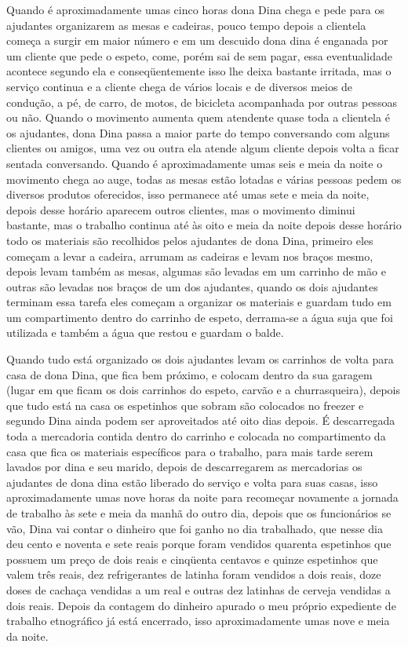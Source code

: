 Quando é aproximadamente umas cinco horas dona Dina chega e pede para os 
ajudantes organizarem as mesas e cadeiras, pouco tempo depois a clientela começa 
a surgir em maior número e em um descuido dona dina é enganada por um cliente 
que pede o espeto, come, porém sai de sem pagar, essa eventualidade acontece 
segundo ela e conseqüentemente isso lhe deixa bastante irritada, mas o serviço 
continua e a cliente chega de vários locais e de diversos meios de condução, a 
pé, de carro, de motos, de bicicleta acompanhada por outras pessoas ou não. 
Quando o movimento aumenta quem atendente quase toda a clientela é os ajudantes, 
dona Dina passa a maior parte do tempo conversando com alguns clientes ou 
amigos, uma vez ou outra ela atende algum cliente depois volta a ficar sentada 
conversando. Quando é aproximadamente umas seis e meia da noite o movimento 
chega ao auge, todas as mesas estão lotadas e várias pessoas pedem os diversos 
produtos oferecidos, isso permanece até umas sete e meia da noite, depois desse 
horário aparecem outros clientes, mas o movimento diminui bastante, mas o 
trabalho continua até às oito e meia da noite depois desse horário todo os 
materiais são recolhidos pelos ajudantes de dona Dina, primeiro eles começam a 
levar a cadeira, arrumam as cadeiras e levam nos braços mesmo, depois levam 
também as mesas, algumas são levadas em um carrinho de mão e outras são levadas 
nos braços de um dos ajudantes, quando os dois ajudantes terminam essa tarefa 
eles começam a organizar os materiais e guardam tudo em um compartimento dentro 
do carrinho de espeto, derrama-se a água suja que foi utilizada e também a água 
que restou e guardam o balde. 

Quando tudo está organizado os dois ajudantes levam os carrinhos de volta para 
casa de dona Dina, que fica bem próximo, e colocam dentro da sua garagem (lugar 
em que ficam os dois carrinhos do espeto, carvão e a churrasqueira), depois que 
tudo está na casa os espetinhos que sobram são colocados no freezer e segundo 
Dina ainda podem ser aproveitados até oito dias depois. É descarregada toda a 
mercadoria contida dentro do carrinho e colocada no compartimento da casa que 
fica os materiais específicos para o trabalho, para mais tarde serem lavados por 
dina e seu marido, depois de descarregarem as mercadorias os ajudantes de dona 
dina estão liberado do serviço e volta para suas casas, isso aproximadamente 
umas nove horas da noite para recomeçar novamente a jornada de trabalho às sete 
e meia da manhã do outro dia, depois que os funcionários se vão, Dina vai contar 
o dinheiro que foi ganho no dia trabalhado, que nesse dia deu cento e noventa e 
sete reais porque foram vendidos quarenta espetinhos que possuem um preço de 
dois reais e cinqüenta centavos e quinze espetinhos que valem três reais, dez 
refrigerantes de latinha foram vendidos a dois reais, doze doses de cachaça 
vendidas a um real e outras dez latinhas de cerveja vendidas a dois reais. 
Depois da contagem do dinheiro apurado o meu próprio expediente de trabalho 
etnográfico já está encerrado, isso aproximadamente umas nove e meia da noite.

